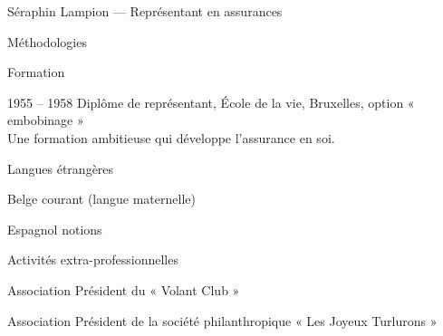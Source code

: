 \documentclass[a4paper,11pt]{article}
\begin{document}
\begin{cv}{Séraphin Lampion --- Représentant en assurances}
\begin{cvlist}{Méthodologies}
\end{cvlist}

\begin{cvlist}{Formation}

\item[1955 -- 1958] Diplôme de représentant, École de la vie,
                    Bruxelles, option « embobinage » \\
                    Une formation ambitieuse qui développe
                    l'assurance en soi.

\end{cvlist}

\begin{cvlist}{Langues étrangères}

\item[Belge] courant (langue maternelle)

\item[Espagnol] notions

\end{cvlist}

\begin{cvlist}{Activités extra-professionnelles}

\item[Association] Président du « Volant Club »

\item[Association] Président de la société philanthropique
                   « Les Joyeux Turlurons »

\end{cvlist}

\end{cv}
\end{document}
